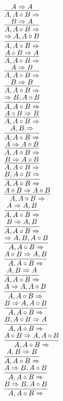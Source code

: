 \documentclass[11pt]{article}
\begin{document}
\begin{center}
\bigskip
\\$\infer{A, A\circ B\Rightarrow }{A\Rightarrow A}$
\bigskip
\\$\infer{A, A\circ B\Rightarrow }{B\Rightarrow A}$
\bigskip
\\$\infer{A, A\circ B\Rightarrow }{\Rightarrow A, A\circ B}$
\bigskip
\\$\infer{A, A\circ B\Rightarrow }{A\circ B\Rightarrow A}$
\bigskip
\\$\infer{A, A\circ B\Rightarrow }{A\Rightarrow B}$
\bigskip
\\$\infer{A, A\circ B\Rightarrow }{B\Rightarrow B}$
\bigskip
\\$\infer{A, A\circ B\Rightarrow }{\Rightarrow B, A\circ B}$
\bigskip
\\$\infer{A, A\circ B\Rightarrow }{A\circ B\Rightarrow B}$
\bigskip
\\$\infer{A, A\circ B\Rightarrow }{A, B\Rightarrow }$
\bigskip
\\$\infer{A, A\circ B\Rightarrow }{A\Rightarrow A\circ B}$
\bigskip
\\$\infer{A, A\circ B\Rightarrow }{B\Rightarrow A\circ B}$
\bigskip
\\$\infer{A, A\circ B\Rightarrow }{B, A\circ B\Rightarrow }$
\bigskip
\\$\infer{A, A\circ B\Rightarrow }{A\circ B\Rightarrow A\circ B}$
\bigskip
\\$\infer{A, A\circ B\Rightarrow }{A\Rightarrow A, B}$
\bigskip
\\$\infer{A, A\circ B\Rightarrow }{B\Rightarrow A, B}$
\bigskip
\\$\infer{A, A\circ B\Rightarrow }{\Rightarrow A, B, A\circ B}$
\bigskip
\\$\infer{A, A\circ B\Rightarrow }{A\circ B\Rightarrow A, B}$
\bigskip
\\$\infer{A, A\circ B\Rightarrow }{A, B\Rightarrow A}$
\bigskip
\\$\infer{A, A\circ B\Rightarrow }{A\Rightarrow A, A\circ B}$
\bigskip
\\$\infer{A, A\circ B\Rightarrow }{B\Rightarrow A, A\circ B}$
\bigskip
\\$\infer{A, A\circ B\Rightarrow }{B, A\circ B\Rightarrow A}$
\bigskip
\\$\infer{A, A\circ B\Rightarrow }{A\circ B\Rightarrow A, A\circ B}$
\bigskip
\\$\infer{A, A\circ B\Rightarrow }{A, B\Rightarrow B}$
\bigskip
\\$\infer{A, A\circ B\Rightarrow }{A\Rightarrow B, A\circ B}$
\bigskip
\\$\infer{A, A\circ B\Rightarrow }{B\Rightarrow B, A\circ B}$

\end{center}
\end{document}
